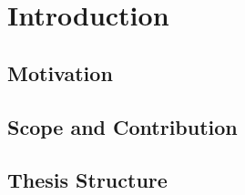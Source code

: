 %

\chapter{\label{ch:1-intro}Introduction} 


\section{Motivation}

\section{Scope and Contribution}

\section{Thesis Structure}

